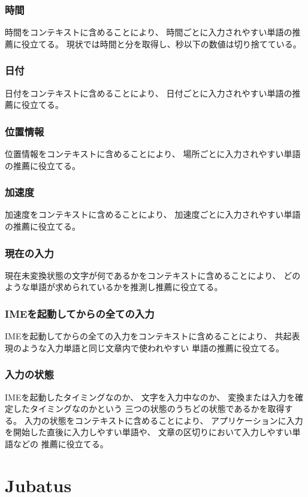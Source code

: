 \subsubsection{時間}
時間をコンテキストに含めることにより、
時間ごとに入力されやすい単語の推薦に役立てる。
現状では時間と分を取得し、秒以下の数値は切り捨てている。

\subsubsection{日付}
日付をコンテキストに含めることにより、
日付ごとに入力されやすい単語の推薦に役立てる。

\subsubsection{位置情報}
位置情報をコンテキストに含めることにより、
場所ごとに入力されやすい単語の推薦に役立てる。

\subsubsection{加速度}
加速度をコンテキストに含めることにより、
加速度ごとに入力されやすい単語の推薦に役立てる。

\subsubsection{現在の入力}
現在未変換状態の文字が何であるかをコンテキストに含めることにより、
どのような単語が求められているかを推測し推薦に役立てる。

\subsubsection{IMEを起動してからの全ての入力}
IMEを起動してからの全ての入力をコンテキストに含めることにより、
共起表現のような入力単語と同じ文章内で使われやすい
単語の推薦に役立てる。

\subsubsection{入力の状態}
IMEを起動したタイミングなのか、
文字を入力中なのか、
変換または入力を確定したタイミングなのかという
三つの状態のうちどの状態であるかを取得する。
入力の状態をコンテキストに含めることにより、
アプリケーションに入力を開始した直後に入力しやすい単語や、
文章の区切りにおいて入力しやすい単語などの
推薦に役立てる。

\section{Jubatus}
\label{sec:jubatus}

